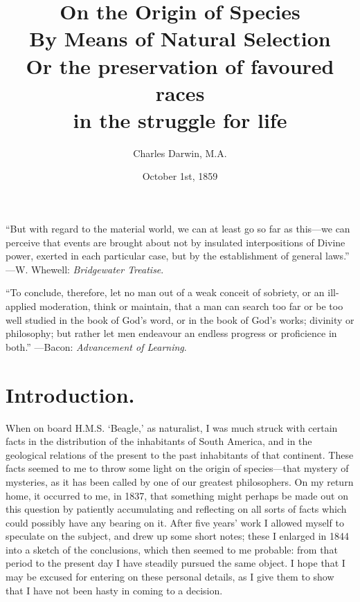 \documentclass{book}
\title{\huge On the Origin of Species \\ \Large By Means of Natural Selection \\ \large
Or the preservation of favoured races \\ in the struggle for life}
\author{Charles Darwin, M.A.}
\date{October 1st, 1859}
\begin{document}
\maketitle


``But with regard to the material world, we can at least go so far as
this---we can perceive that events are brought about not by insulated
interpositions of Divine power, exerted in each particular case, but by the
establishment of general laws.''%
---W. Whewell: \emph{Bridgewater Treatise}.

``To conclude, therefore, let no man out of a weak conceit of sobriety, or
an ill-applied moderation, think or maintain, that a man can search too far or
be too well studied in the book of God's word, or in the book of
God's works; divinity or philosophy; but rather let men endeavour an
endless progress or proficience in both.''%
---Bacon: \emph{Advancement of Learning}.


\chapter*{Introduction.}

When on board H.M.S. `Beagle,' as naturalist, I was much struck
with certain facts in the distribution of the inhabitants of South America, and
in the geological relations of the present to the past inhabitants of that
continent. These facts seemed to me to throw some light on the origin of
species---that mystery of mysteries, as it has been called by one of our
greatest philosophers. On my return home, it occurred to me, in 1837, that
something might perhaps be made out on this question by patiently accumulating
and reflecting on all sorts of facts which could possibly have any bearing on
it. After five years' work I allowed myself to speculate on the subject,
and drew up some short notes; these I enlarged in 1844 into a sketch of the
conclusions, which then seemed to me probable: from that period to the present
day I have steadily pursued the same object. I hope that I may be excused for
entering on these personal details, as I give them to show that I have not been
hasty in coming to a decision.
\end{document}
